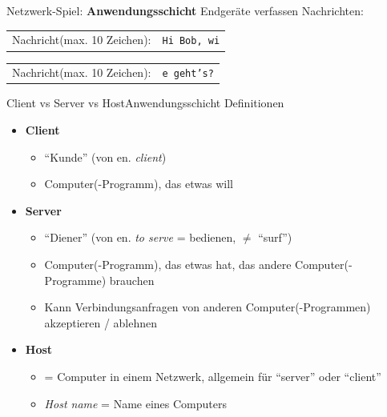 \begin{frame}{Netzwerk-Spiel: \textbf{Anwendungsschicht}}
    Endgeräte verfassen Nachrichten:
    \begin{table}[H]
        \centering
        \begin{tabular}{p{2cm}|l}
            \rowcolor{\applicationLayerColor!20}Nachricht\newline\tiny (max. 10 Zeichen): & \texttt{Hi Bob, wi} \\
        \end{tabular}
        \begin{tabular}{p{2cm}|l}
            \rowcolor{\applicationLayerColor!20}Nachricht\newline\tiny (max. 10 Zeichen): & \texttt{e geht's?} \\
        \end{tabular}
    \end{table}
\end{frame}


\begin{frame}[fragile]{\faLaptop{} Client vs Server vs Host}{Anwendungsschicht}
    Definitionen
    \begin{itemize}[<+->]
        \item \textbf{Client}
              \begin{itemize}
                  \item \enquote{Kunde} (von en. \textit{client})
                  \item Computer(-Programm), das etwas will
              \end{itemize}
        \item \textbf{Server}
              \begin{itemize}
                  \item \enquote{Diener} (von en. \textit{to serve} = bedienen, $\neq$ \enquote{surf})
                  \item Computer(-Programm), das etwas hat, das andere Computer(-Programme) brauchen
                  \item Kann Verbindungsanfragen von anderen Computer(-Programmen) akzeptieren / ablehnen
              \end{itemize}
        \item \textbf{Host}
              \begin{itemize}
                  \item = Computer in einem Netzwerk, allgemein für \enquote{server} oder \enquote{client}
                  \item \textit{Host name} = Name eines Computers
              \end{itemize}

    \end{itemize}
\end{frame}

